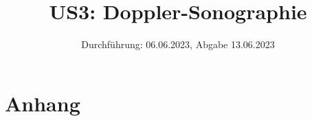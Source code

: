 

\title{US3: Doppler-Sonographie}
\date{Durchführung: 06.06.2023, Abgabe 13.06.2023}


\maketitle
\thispagestyle{empty} 
\tableofcontents
\newpage
\setcounter{page}{1}






\printbibliography
\newpage

\section*{Anhang}

